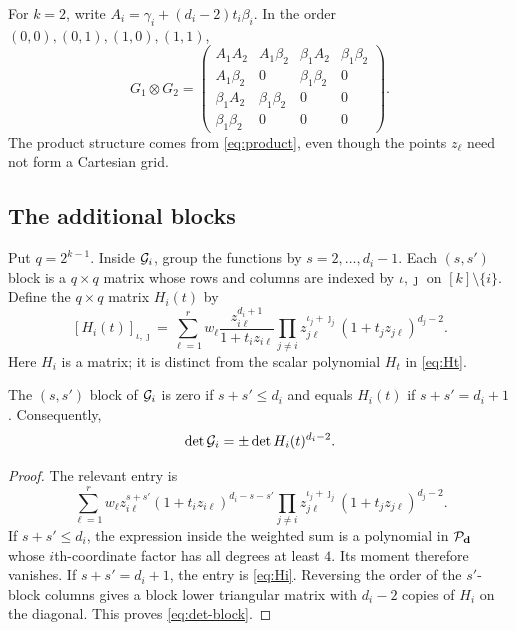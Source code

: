 \begin{example}\label{ex:G0}
For $k=2$, write $A_i=\gamma_i+(d_i-2)t_i\beta_i$.
In the order $(0,0),(0,1),(1,0),(1,1)$,
\begin{equation}\label{eq:four-by-four}
G_1\otimes G_2=
\begin{pmatrix}
A_1A_2&A_1\beta_2&\beta_1A_2&\beta_1\beta_2\\
A_1\beta_2&0&\beta_1\beta_2&0\\
\beta_1A_2&\beta_1\beta_2&0&0\\
\beta_1\beta_2&0&0&0
\end{pmatrix}.
\end{equation}
The product structure comes from \eqref{eq:product}, even though
the points $z_\ell$ need not form a Cartesian grid.
\end{example}

\subsection{The additional blocks}
Put $q=2^{k-1}$. Inside $\mathcal G_i$, group the functions by
$s=2,\ldots,d_i-1$. Each $(s,s')$ block is a $q\times q$ matrix
whose rows and columns are indexed by $\iota,\jmath$ on
$[k]\setminus\{i\}$. Define the $q\times q$ matrix $H_i(t)$ by
\begin{equation}\label{eq:Hi}
[H_i(t)]_{\iota,\jmath}
=\sum_{\ell=1}^r w_\ell
\frac{z_{i\ell}^{d_i+1}}{1+t_i z_{i\ell}}
\prod_{j\ne i}z_{j\ell}^{\iota_j+\jmath_j}
(1+t_jz_{j\ell})^{d_j-2}.
\end{equation}
Here $H_i$ is a matrix; it is distinct from the scalar polynomial
$H_t$ in \eqref{eq:Ht}.

\begin{lemma}\label{lem:anti}
The $(s,s')$ block of $\mathcal G_i$ is zero if $s+s'\le d_i$ and
equals $H_i(t)$ if $s+s'=d_i+1$. Consequently,
\begin{equation}\label{eq:det-block}
\det\mathcal G_i=\pm\det H_i(t)^{d_i-2}.
\end{equation}
\end{lemma}
\begin{proof}
The relevant entry is
\begin{equation}\label{eq:ss-entry}
\sum_{\ell=1}^r w_\ell z_{i\ell}^{s+s'}
(1+t_i z_{i\ell})^{d_i-s-s'}
\prod_{j\ne i}z_{j\ell}^{\iota_j+\jmath_j}
(1+t_j z_{j\ell})^{d_j-2}.
\end{equation}
If $s+s'\le d_i$, the expression inside the weighted sum is a
polynomial in $\mathcal P_{\mathbf d}$ whose $i$th-coordinate factor has all
degrees at least $4$. Its moment therefore vanishes.
If $s+s'=d_i+1$, the entry is \eqref{eq:Hi}.
Reversing the order of the $s'$-block columns gives a block lower
triangular matrix with $d_i-2$ copies of $H_i$ on the diagonal.
This proves \eqref{eq:det-block}.
\end{proof}

